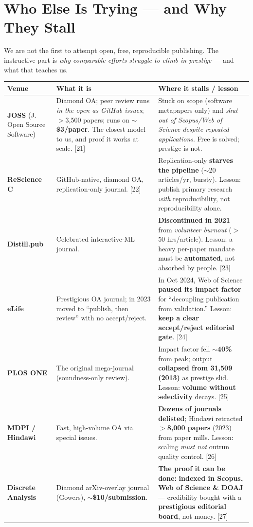 \documentclass[11pt]{article}
\newcommand{\stat}[1]{{\sffamily\bfseries\color{accent}#1}}
\newcommand{\src}[1]{{\footnotesize\color{ink3}[#1]}}
\begin{document}
\section{Who Else Is Trying --- and Why They Stall}

We are not the first to attempt open, free, reproducible publishing. The instructive part is \emph{why comparable efforts struggle to climb in prestige} --- and what that teaches us.

\renewcommand{\arraystretch}{1.32}
\begin{center}\small
\begin{tabular}{@{}p{2.9cm} p{6.3cm} p{6.0cm}@{}}
\toprule
\textbf{Venue} & \textbf{What it is} & \textbf{Where it stalls / lesson} \\
\midrule
\textbf{JOSS} \newline (J. Open Source Software) &
Diamond OA; peer review runs \emph{in the open as GitHub issues}; $>$3{,}500 papers; runs on \stat{$\sim$\$3/paper}. The closest model to us, and proof it works at scale. \src{21} &
Stuck on scope (software metapapers only) and \emph{shut out of Scopus/Web of Science despite repeated applications}. Free is solved; prestige is not. \\
\textbf{ReScience C} &
GitHub-native, diamond OA, replication-only journal. \src{22} &
Replication-only \stat{starves the pipeline} ($\sim$20 articles/yr, bursty). Lesson: publish primary research \emph{with} reproducibility, not reproducibility alone. \\
\textbf{Distill.pub} &
Celebrated interactive-ML journal. &
\stat{Discontinued in 2021} from \emph{volunteer burnout} ($>$50 hrs/article). Lesson: a heavy per-paper mandate must be \stat{automated}, not absorbed by people. \src{23} \\
\textbf{eLife} &
Prestigious OA journal; in 2023 moved to ``publish, then review'' with no accept/reject. &
In Oct 2024, Web of Science \stat{paused its impact factor} for ``decoupling publication from validation.'' Lesson: \stat{keep a clear accept/reject editorial gate}. \src{24} \\
\textbf{PLOS ONE} &
The original mega-journal (soundness-only review). &
Impact factor fell \stat{$\sim$40\%} from peak; output \stat{collapsed from 31{,}509 (2013)} as prestige slid. Lesson: \stat{volume without selectivity} decays. \src{25} \\
\textbf{MDPI / Hindawi} &
Fast, high-volume OA via special issues. &
\stat{Dozens of journals delisted}; Hindawi retracted \stat{$>$8{,}000 papers} (2023) from paper mills. Lesson: scaling \emph{must not} outrun quality control. \src{26} \\
\midrule
\textbf{Discrete Analysis} &
Diamond arXiv-overlay journal (Gowers), \stat{$\sim$\$10/submission}. &
\textbf{The proof it can be done:} \stat{indexed in Scopus, Web of Science \& DOAJ} --- credibility bought with a \stat{prestigious editorial board}, not money. \src{27} \\
\bottomrule
\end{tabular}
\end{center}
\end{document}
